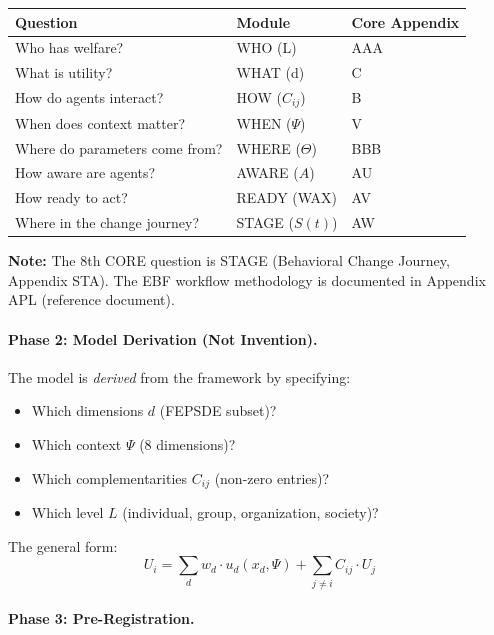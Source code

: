 \begin{center}
\small
\begin{tabular}{@{}lll@{}}
\toprule
\textbf{Question} & \textbf{Module} & \textbf{Core Appendix} \\
\midrule
Who has welfare? & WHO (L) & AAA \\
What is utility? & WHAT (d) & C \\
How do agents interact? & HOW ($C_{ij}$) & B \\
When does context matter? & WHEN ($\Psi$) & V \\
Where do parameters come from? & WHERE ($\Theta$) & BBB \\
How aware are agents? & AWARE ($A$) & AU \\
How ready to act? & READY (WAX) & AV \\
Where in the change journey? & STAGE ($S(t)$) & AW \\
\bottomrule
\end{tabular}
\end{center}

\textbf{Note:} The 8th CORE question is STAGE (Behavioral Change Journey, Appendix STA).
The EBF workflow methodology is documented in Appendix APL (reference document).

\paragraph{Phase 2: Model Derivation (Not Invention).}

The model is \textit{derived} from the framework by specifying:
\begin{itemize}[nosep]
    \item Which dimensions $d$ (FEPSDE subset)?
    \item Which context $\Psi$ (8 dimensions)?
    \item Which complementarities $C_{ij}$ (non-zero entries)?
    \item Which level $L$ (individual, group, organization, society)?
\end{itemize}

The general form:
\begin{equation}
U_i = \sum_d w_d \cdot u_d(x_d, \Psi) + \sum_{j \neq i} C_{ij} \cdot U_j
\end{equation}

\paragraph{Phase 3: Pre-Registration.}

